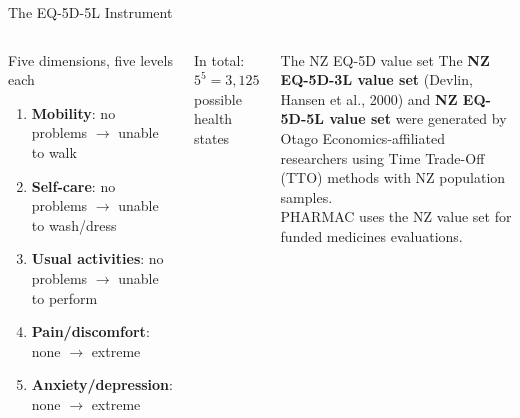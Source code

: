 \documentclass[aspectratio=169, 12pt]{beamer}
\begin{document}
\begin{frame}{The EQ-5D-5L Instrument}
  \begin{columns}
      \begin{block}{Five dimensions, five levels each}
        \begin{enumerate}
          \item \textbf{Mobility}: no problems $\to$ unable to walk
          \item \textbf{Self-care}: no problems $\to$ unable to wash/dress
          \item \textbf{Usual activities}: no problems $\to$ unable to perform
          \item \textbf{Pain/discomfort}: none $\to$ extreme
          \item \textbf{Anxiety/depression}: none $\to$ extreme
        \end{enumerate}
      \end{block}
      In total: $5^5 = 3,125$ possible health states
      \begin{alertblock}{The NZ EQ-5D value set}
        The \textbf{NZ EQ-5D-3L value set} (Devlin, Hansen et al., 2000) and
        \textbf{NZ EQ-5D-5L value set} were generated by Otago Economics-affiliated researchers
        using Time Trade-Off (TTO) methods with NZ population samples.\\[0.3em]
        PHARMAC uses the NZ value set for funded medicines evaluations.
      \end{alertblock}
  \end{columns}
\end{frame}
\end{document}
